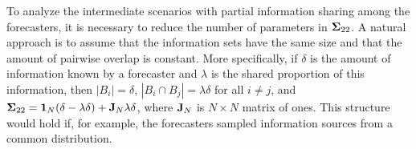 \documentclass[12pt]{article}
\theoremstyle{definition}
\theoremstyle{definition}
\def\probit{p_{\rm probit}}
\begin{document}
To analyze the intermediate scenarios with partial information sharing among the forecasters, it is necessary to reduce the number of parameters in ${\bf\Sigma}_{22}$. A natural approach is to assume that the
information sets have the same size and that the amount of pairwise overlap
is constant. More specifically, if $\delta$ is the amount of information known by a forecaster and
$\lambda$ is the shared proportion of this information, then $|B_{i}| =
\delta$, $|B_{i} \cap B_{j}| = \lambda \delta$ for all $i \neq
j$, and  ${\bf\Sigma}_{22} = {\bf 1}_N(\delta - \lambda \delta) + {\bf J}_N \lambda \delta$, where ${\bf J}_N$ is $N \times N$ matrix of ones.
This structure would hold if, for example, the
forecasters sampled information sources from a common distribution.
\end{document}
